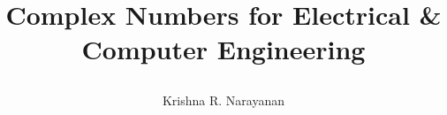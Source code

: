 \documentclass[11pt,openright]{book}
\begin{document}
\author{Krishna R. Narayanan}
\title{Complex Numbers for Electrical \& Computer Engineering \\
  \begin{figure}[h]\centering
  
  \end{figure}
}
\maketitle


%
%

\tableofcontents






%

\backmatter%
%
%
\printindex

\end{document}
